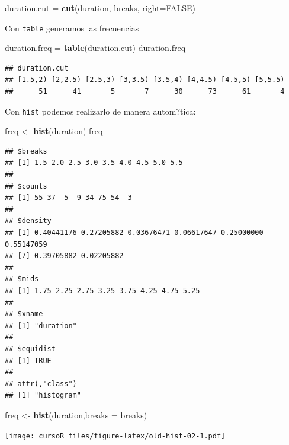 \documentclass[]{book}
\newenvironment{Shaded}{\begin{snugshade}}{\end{snugshade}}
\newcommand{\KeywordTok}[1]{\textcolor[rgb]{0.13,0.29,0.53}{\textbf{#1}}}
\newcommand{\DataTypeTok}[1]{\textcolor[rgb]{0.13,0.29,0.53}{#1}}
\newcommand{\StringTok}[1]{\textcolor[rgb]{0.31,0.60,0.02}{#1}}
\newcommand{\OtherTok}[1]{\textcolor[rgb]{0.56,0.35,0.01}{#1}}
\newcommand{\NormalTok}[1]{#1}
\begin{document}
\begin{Shaded}
\begin{Highlighting}[]
\NormalTok{duration.cut =}\StringTok{ }\KeywordTok{cut}\NormalTok{(duration, breaks, }\DataTypeTok{right=}\OtherTok{FALSE}\NormalTok{) }
\end{Highlighting}
\end{Shaded}

Con \texttt{table} generamos las frecuencias

\begin{Shaded}
\begin{Highlighting}[]
\NormalTok{duration.freq =}\StringTok{ }\KeywordTok{table}\NormalTok{(duration.cut) }
\NormalTok{duration.freq}
\end{Highlighting}
\end{Shaded}

\begin{verbatim}
## duration.cut
## [1.5,2) [2,2.5) [2.5,3) [3,3.5) [3.5,4) [4,4.5) [4.5,5) [5,5.5) 
##      51      41       5       7      30      73      61       4
\end{verbatim}

Con \texttt{hist} podemos realizarlo de manera autom?tica:

\begin{Shaded}
\begin{Highlighting}[]
\NormalTok{freq <-}\StringTok{ }\KeywordTok{hist}\NormalTok{(duration)}
\NormalTok{freq}
\end{Highlighting}
\end{Shaded}

\begin{verbatim}
## $breaks
## [1] 1.5 2.0 2.5 3.0 3.5 4.0 4.5 5.0 5.5
## 
## $counts
## [1] 55 37  5  9 34 75 54  3
## 
## $density
## [1] 0.40441176 0.27205882 0.03676471 0.06617647 0.25000000 0.55147059
## [7] 0.39705882 0.02205882
## 
## $mids
## [1] 1.75 2.25 2.75 3.25 3.75 4.25 4.75 5.25
## 
## $xname
## [1] "duration"
## 
## $equidist
## [1] TRUE
## 
## attr(,"class")
## [1] "histogram"
\end{verbatim}

\begin{Shaded}
\begin{Highlighting}[]
\NormalTok{freq <-}\StringTok{ }\KeywordTok{hist}\NormalTok{(duration,}\DataTypeTok{breaks =}\NormalTok{ breaks)}
\end{Highlighting}
\end{Shaded}

\texttt{[image: cursoR\_files/figure-latex/old-hist-02-1.pdf]}
\end{document}
